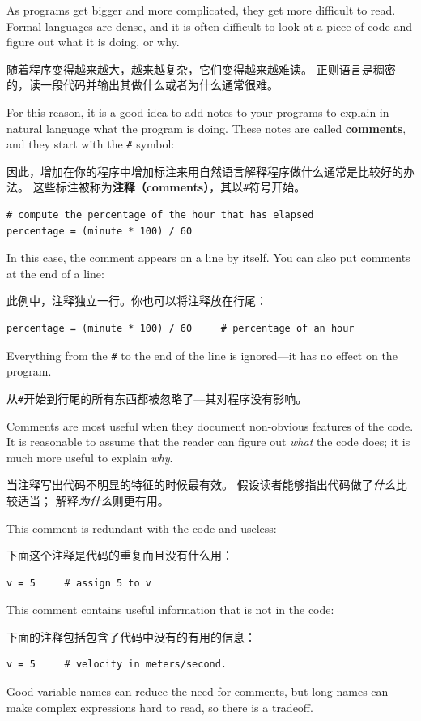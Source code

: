 \documentclass[10pt]{book}
\begin{document}
\begin{CJK}{UTF8}{gbsn}
As programs get bigger and more complicated, they get more difficult
to read.  Formal languages are dense, and it is often difficult to
look at a piece of code and figure out what it is doing, or why.

随着程序变得越来越大，越来越复杂，它们变得越来越难读。
正则语言是稠密的，读一段代码并输出其做什么或者为什么通常很难。

For this reason, it is a good idea to add notes to your programs to explain
in natural language what the program is doing.  These notes are called
{\bf comments}, and they start with the \verb"#" symbol:

因此，增加在你的程序中增加标注来用自然语言解释程序做什么通常是比较好的办法。
这些标注被称为{\bf 注释（comments）}，其以\verb"#"符号开始。

\begin{verbatim}
# compute the percentage of the hour that has elapsed
percentage = (minute * 100) / 60
\end{verbatim}
%
In this case, the comment appears on a line by itself.  You can also put
comments at the end of a line:

此例中，注释独立一行。你也可以将注释放在行尾：

\begin{verbatim}
percentage = (minute * 100) / 60     # percentage of an hour
\end{verbatim}
%
Everything from the {\tt \#} to the end of the line is ignored---it
has no effect on the program.

从{\tt \#}开始到行尾的所有东西都被忽略了---其对程序没有影响。

Comments are most useful when they document non-obvious features of
the code.  It is reasonable to assume that the reader can figure out
{\em what} the code does; it is much more useful to explain {\em why}.

当注释写出代码不明显的特征的时候最有效。
假设读者能够指出代码做了{\em 什么}比较适当；
解释{\em 为什么}则更有用。

This comment is redundant with the code and useless:

下面这个注释是代码的重复而且没有什么用：

\begin{verbatim}
v = 5     # assign 5 to v
\end{verbatim}
%
This comment contains useful information that is not in the code:

下面的注释包括包含了代码中没有的有用的信息：

\begin{verbatim}
v = 5     # velocity in meters/second. 
\end{verbatim}
%
Good variable names can reduce the need for comments, but
long names can make complex expressions hard to read, so there is
a tradeoff.


\end{CJK}
\end{document}
